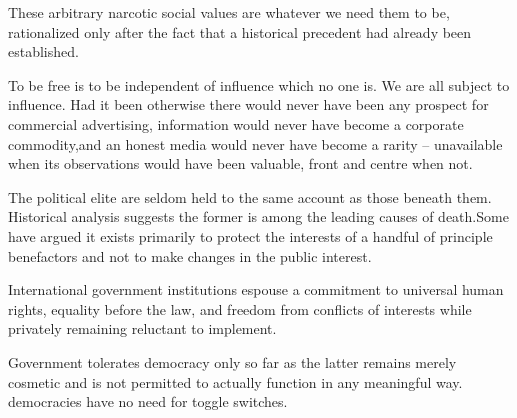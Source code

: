 These arbitrary narcotic social values are whatever we need them to be, rationalized only after the fact that a historical precedent had already been established.


To be free is to be independent of influence which no one is. We are all subject to influence. Had it been otherwise there would never have been any prospect for commercial advertising, information would never have become a corporate commodity,\footnotecite[santoso2008]\footnotecite[nagata2011] and an honest media would never have become a rarity -- unavailable when its observations would have been valuable,
front and centre when not.


The political elite are seldom held to the same account as those beneath them.
Historical analysis suggests the former is among the leading causes of death. Some have argued it exists primarily to protect the interests of a handful of principle benefactors
\footnotecite[wilson2007]
\footnotecite[bowie2012]
\footnotecite[favel2008]
and not to make changes in the public interest.

International government institutions espouse a commitment to universal human rights, equality before the law, and freedom from conflicts of interests while privately remaining reluctant to implement.

Government tolerates democracy only so far as the latter remains merely cosmetic and is not permitted to actually function in any meaningful way. democracies have no need for toggle switches.

